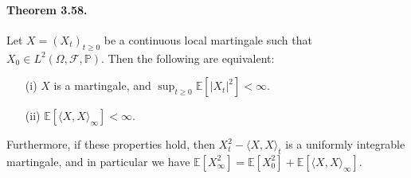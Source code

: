 \documentclass{article}
\numberwithin{equation}{section}
\newcommand{\E}{\mathbb{E}}
\renewcommand{\P}{\mathbb{P}}
\theoremstyle{plain}
\theoremstyle{definition}
\begin{document}
\paragraph{Theorem 3.58.\label{thm:3.58}} Let $X=(X_t)_{t\geq 0}$ be a continuous local martingale such that $X_0\in L^2(\Omega,\mathscr{F},\P)$. Then the following are equivalent:
\begin{itemize}
	\item[(i)] $X$ is a martingale, and $\sup_{t\geq 0}\E[\vert X_t\vert^2]<\infty$.
	\item[(ii)] $\E\left[\langle X,X\rangle_\infty\right]<\infty$.
\end{itemize}
Furthermore, if these properties hold, then $X_t^2-\langle X,X\rangle_t$ is a uniformly integrable martingale, and in particular we have $\E[X_\infty^2]=\E[X_0^2]+\E[\langle X,X\rangle_\infty]$.
\end{document}
